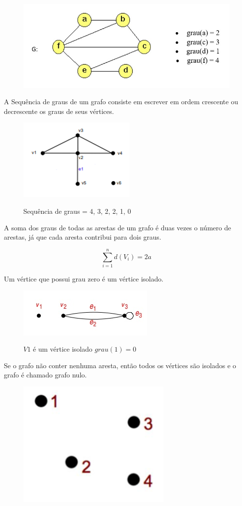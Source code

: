 \documentclass{article}
\begin{document}
\begin{figure}[H]
	\centering
	\includegraphics[width=0.5\linewidth]{"Figuras/graus1"}
	\label{fig:graus1}
	\caption{}
\end{figure}
		A Sequência de graus de um grafo consiste em escrever em ordem crescente ou decrescente os graus de seus vértices.
		
	\begin{figure}[H] 	
		\centering
		\includegraphics[width=0.3\linewidth]{"Figuras/graus2"}
		\label{fig:graus2}
		\caption{{\small Sequência de graus = 4, 3, 2, 2, 1, 0}}
	\end{figure}
	\vspace*{0.2cm}
		A soma dos graus de todas as arestas de um grafo é duas vezes o número de arestas, já que cada aresta contribui para dois graus.
		\begin{center}
			\begin{equation*}
				\sum_{i=1}^{n}{d(V_{i}) = 2a}
			\end{equation*}
		\end{center}\vspace*{0.5cm}
	Um vértice que possui grau zero é um vértice isolado. 
	\begin{figure}[H]
		\centering
		\includegraphics[width=0.4\linewidth]{"Figuras/grau3"}
		\label{fig:grau3}
		\caption{{\small $V1$ é um vértice isolado $grau(1) = 0$}}
	\end{figure}
		\newpage
		Se o grafo não conter nenhuma aresta, então todos os vértices são isolados e o grafo é chamado grafo nulo.
		
	\begin{figure}[H]
		\centering
		\includegraphics[width=0.2\linewidth]{"Figuras/grau4"}
		\label{fig:grau4}
		\caption{}
	\end{figure}\vspace*{0.2cm}	
\end{document}
